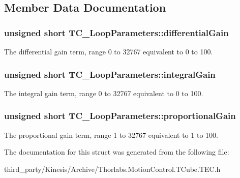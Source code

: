 \subsection{Member Data Documentation}
\subsubsection[{\texorpdfstring{differential\+Gain}{differentialGain}}]{\setlength{\rightskip}{0pt plus 5cm}unsigned short T\+C\+\_\+\+Loop\+Parameters\+::differential\+Gain}\hypertarget{struct_t_c___loop_parameters_acb876b6c832cb9ab6cfcd1c07e2a1776}{}\label{struct_t_c___loop_parameters_acb876b6c832cb9ab6cfcd1c07e2a1776}


The differential gain term, range 0 to 32767 equivalent to 0 to 100. 

\subsubsection[{\texorpdfstring{integral\+Gain}{integralGain}}]{\setlength{\rightskip}{0pt plus 5cm}unsigned short T\+C\+\_\+\+Loop\+Parameters\+::integral\+Gain}\hypertarget{struct_t_c___loop_parameters_ab773223778f0ad09b360c222e410ed8f}{}\label{struct_t_c___loop_parameters_ab773223778f0ad09b360c222e410ed8f}


The integral gain term, range 0 to 32767 equivalent to 0 to 100. 

\subsubsection[{\texorpdfstring{proportional\+Gain}{proportionalGain}}]{\setlength{\rightskip}{0pt plus 5cm}unsigned short T\+C\+\_\+\+Loop\+Parameters\+::proportional\+Gain}\hypertarget{struct_t_c___loop_parameters_abda629ff9a082cf2998db53221d403bd}{}\label{struct_t_c___loop_parameters_abda629ff9a082cf2998db53221d403bd}


The proportional gain term, range 1 to 32767 equivalent to 1 to 100. 



The documentation for this struct was generated from the following file\+:\begin{DoxyCompactItemize}
\item 
third\+\_\+party/\+Kinesis/\+Archive/Thorlabs.\+Motion\+Control.\+T\+Cube.\+T\+E\+C.\+h\end{DoxyCompactItemize}
